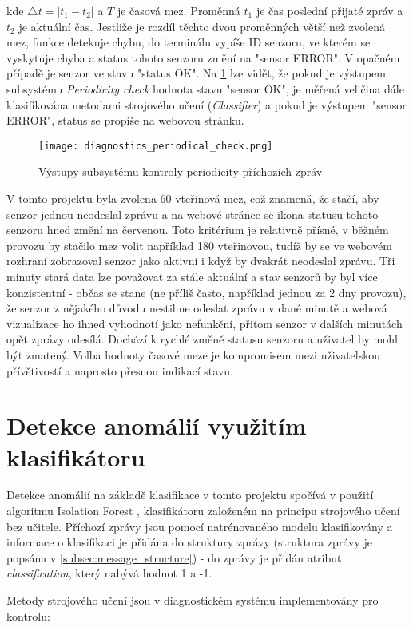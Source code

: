 kde \( \triangle t = |t_1 - t_2| \) a $T$ je časová mez. Proměnná $t_1$ je čas poslední přijaté zpráv a $t_2$ je aktuální čas. Jestliže je rozdíl těchto dvou proměnných větší než zvolená mez, funkce detekuje chybu, do terminálu vypíše ID senzoru, ve kterém se vyskytuje chyba a status tohoto senzoru změní na "sensor ERROR". V opačném případě je senzor ve stavu "status OK". Na \cref{fig:diagnostics_periodical_check} lze vidět, že pokud je výstupem subsystému \textit{Periodicity check} hodnota stavu "sensor OK", je měřená veličina dále klasifikována metodami strojového učení (\textit{Classifier}) a pokud je výstupem "sensor ERROR", status se propíše na webovou stránku.

\begin{figure}[H]
  \centering
  \texttt{[image: diagnostics\_periodical\_check.png]}
  \caption{Výstupy subsystému kontroly periodicity příchozích zpráv}
  \label{fig:diagnostics_periodical_check}
\end{figure} 

V tomto projektu byla zvolena 60 vteřinová mez, což znamená, že stačí, aby senzor jednou neodeslal zprávu a na webové stránce se ikona statusu tohoto senzoru hned změní na červenou. Toto kritérium je relativně přísné, v běžném provozu by stačilo mez volit například 180 vteřinovou, tudíž by se ve webovém rozhraní zobrazoval senzor jako aktivní i když by dvakrát neodeslal zprávu. Tři minuty stará data lze považovat za stále aktuální a stav senzorů by byl více konzistentní - občas se stane (ne příliš často, například jednou za 2 dny provozu), že senzor z nějakého důvodu nestihne odeslat zprávu v dané minutě a webová vizualizace ho ihned vyhodnotí jako nefunkční, přitom senzor v dalších minutách opět zprávy odesílá. Dochází k rychlé změně statusu senzoru a uživatel by mohl být zmatený. Volba hodnoty časové meze je kompromisem mezi uživatelskou přívětivostí a naprosto přesnou indikací stavu. 

\section{Detekce anomálií využitím klasifikátoru} \label{sec:classifier}
Detekce anomálií na základě klasifikace v tomto projektu spočívá v použití algoritmu Isolation Forest \cite{scikit-learn}, klasifikátoru založeném na principu strojového učení bez učitele. Příchozí zprávy jsou pomocí natrénovaného modelu klasifikovány a informace o klasifikaci je přidána do struktury zprávy (struktura zprávy je popsána v \cref{subsec:message_structure}) - do zprávy je přidán atribut \textit{classification}, který nabývá hodnot 1 a -1. \par
Metody strojového učení jsou v diagnostickém systému implementovány pro kontrolu:

